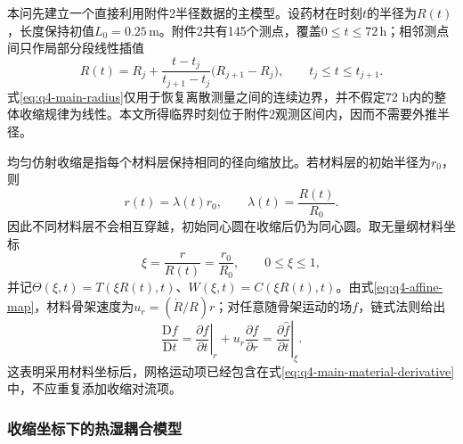 \documentclass[withoutpreface,bwprint]{cumcmthesis}
\begin{document}
本问先建立一个直接利用附件2半径数据的主模型。设药材在时刻$t$的半径为$R(t)$，长度保持初值$L_0=0.25\,\mathrm m$。附件2共有145个测点，覆盖$0\le t\le72\,\mathrm h$；相邻测点间只作局部分段线性插值
\begin{equation}
R(t)=R_j+\frac{t-t_j}{t_{j+1}-t_j}\bigl(R_{j+1}-R_j\bigr),
\qquad t_j\le t\le t_{j+1}.
\label{eq:q4-main-radius}
\end{equation}
式\eqref{eq:q4-main-radius}仅用于恢复离散测量之间的连续边界，并不假定72 h内的整体收缩规律为线性。本文所得临界时刻位于附件2观测区间内，因而不需要外推半径。

均匀仿射收缩是指每个材料层保持相同的径向缩放比。若材料层的初始半径为$r_0$，则
\begin{equation}
r(t)=\lambda(t)r_0,
\qquad
\lambda(t)=\frac{R(t)}{R_0}.
\label{eq:q4-affine-map}
\end{equation}
因此不同材料层不会相互穿越，初始同心圆在收缩后仍为同心圆。取无量纲材料坐标
\begin{equation}
\xi=\frac{r}{R(t)}=\frac{r_0}{R_0},
\qquad 0\le\xi\le1,
\label{eq:q4-main-xi}
\end{equation}
并记$\Theta(\xi,t)=T(\xi R(t),t)$、$W(\xi,t)=C(\xi R(t),t)$。由式\eqref{eq:q4-affine-map}，材料骨架速度为$u_r=(\dot R/R)r$；对任意随骨架运动的场$f$，链式法则给出
\begin{equation}
\frac{\mathrm Df}{\mathrm Dt}
=\left.\frac{\partial f}{\partial t}\right|_r
+u_r\frac{\partial f}{\partial r}
=\left.\frac{\partial \widehat f}{\partial t}\right|_\xi.
\label{eq:q4-main-material-derivative}
\end{equation}
这表明采用材料坐标后，网格运动项已经包含在式\eqref{eq:q4-main-material-derivative}中，不应重复添加收缩对流项。

\subsubsection{收缩坐标下的热湿耦合模型}
\end{document}
